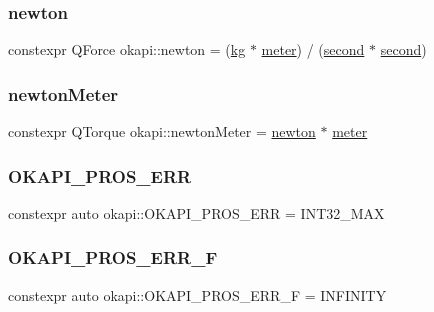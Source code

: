 \mbox{\label{namespaceokapi_a66d91011ac90f25dc5e518f092cc5a74}} 
\subsubsection{\texorpdfstring{newton}{newton}}
{\footnotesize\ttfamily constexpr Q\+Force okapi\+::newton = (\mbox{\hyperlink{namespaceokapi_afcc67eb55c70e21f82cbee49aa19d05a}{kg}} $\ast$ \mbox{\hyperlink{namespaceokapi_a59563b3d4b18633f1c8d852e2932d1db}{meter}}) / (\mbox{\hyperlink{namespaceokapi_ae9ece1daf9cd9f6d3a597cc5c0dc7b40}{second}} $\ast$ \mbox{\hyperlink{namespaceokapi_ae9ece1daf9cd9f6d3a597cc5c0dc7b40}{second}})}

\mbox{\label{namespaceokapi_a3d685da47b39ff4bdf1936c2e12076ee}} 
\subsubsection{\texorpdfstring{newtonMeter}{newtonMeter}}
{\footnotesize\ttfamily constexpr Q\+Torque okapi\+::newton\+Meter = \mbox{\hyperlink{namespaceokapi_a66d91011ac90f25dc5e518f092cc5a74}{newton}} $\ast$ \mbox{\hyperlink{namespaceokapi_a59563b3d4b18633f1c8d852e2932d1db}{meter}}}

\mbox{\label{namespaceokapi_a18913fb1230fd1353366981f1f78335c}} 
\subsubsection{\texorpdfstring{OKAPI\_PROS\_ERR}{OKAPI\_PROS\_ERR}}
{\footnotesize\ttfamily constexpr auto okapi\+::\+O\+K\+A\+P\+I\+\_\+\+P\+R\+O\+S\+\_\+\+E\+RR = I\+N\+T32\+\_\+\+M\+AX\hspace{0.3cm}{\ttfamily [static]}}

\mbox{\label{namespaceokapi_a0f2b0da948b0276b354ca035af11380e}} 
\subsubsection{\texorpdfstring{OKAPI\_PROS\_ERR\_F}{OKAPI\_PROS\_ERR\_F}}
{\footnotesize\ttfamily constexpr auto okapi\+::\+O\+K\+A\+P\+I\+\_\+\+P\+R\+O\+S\+\_\+\+E\+R\+R\+\_\+F = I\+N\+F\+I\+N\+I\+TY\hspace{0.3cm}{\ttfamily [static]}}

